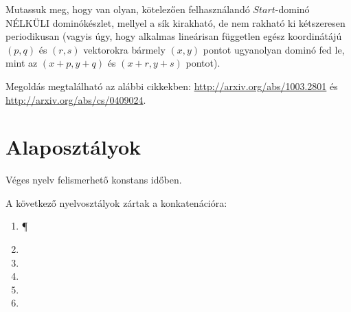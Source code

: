 	\begin{Exercise}[counter={sorszam}, difficulty=2]
		Mutassuk meg, hogy van olyan, k\"otelez\H oen felhaszn\'aland\'o $Start$-domin\'o N\'ELK\"ULI dominókészlet, mellyel a sík kirakható, de nem
		rakható ki kétszeresen periodikusan (vagyis úgy, hogy alkalmas lineárisan
		független egész koordinátájú $(p, q)$ és $(r, s)$ vektorokra bármely $(x,y)$
		pontot ugyanolyan dominó fed le, mint az $(x + p, y + q)$ és $(x + r, y +  s)$ pontot).
	\end{Exercise}	
	\begin{Answer}
		Megold\'as megtal\'alhat\'o az al\'abbi cikkekben: \url{http://arxiv.org/abs/1003.2801} \'es \url{http://arxiv.org/abs/cs/0409024}.
	\end{Answer}










\chapter{Alaposzt\'alyok}

	

\begin{Exercise}[counter={sorszam}, difficulty=-1]
	Véges nyelv felismerhető konstans időben.
\end{Exercise}


\begin{Exercise}[counter={sorszam}, difficulty=0]
	A következő nyelvosztályok zártak a konkatenációra: 
	\begin{enumerate}
		\item \P
		\item \NP
		\item \ZPP
		\item \LOGSPACE
		\item \NL
		\item \Ppoly
	\end{enumerate}
\end{Exercise}


